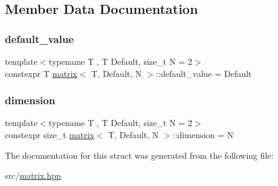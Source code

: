 \subsection{Member Data Documentation}
\mbox{\label{structmatrix_a4ef29fe79b527f2ca6c6004dc56957fa}} 
\subsubsection{\texorpdfstring{default\+\_\+value}{default\_value}}
{\footnotesize\ttfamily template$<$typename T , T Default, size\+\_\+t N = 2$>$ \\
constexpr T \hyperlink{structmatrix}{matrix}$<$ T, Default, N $>$\+::default\+\_\+value = Default\hspace{0.3cm}{\ttfamily [static]}}

\mbox{\label{structmatrix_ad9335b977ea0dfdd152314be10591379}} 
\subsubsection{\texorpdfstring{dimension}{dimension}}
{\footnotesize\ttfamily template$<$typename T , T Default, size\+\_\+t N = 2$>$ \\
constexpr size\+\_\+t \hyperlink{structmatrix}{matrix}$<$ T, Default, N $>$\+::dimension = N\hspace{0.3cm}{\ttfamily [static]}}



The documentation for this struct was generated from the following file\+:\begin{DoxyCompactItemize}
\item 
src/\hyperlink{matrix_8hpp}{matrix.\+hpp}\end{DoxyCompactItemize}
